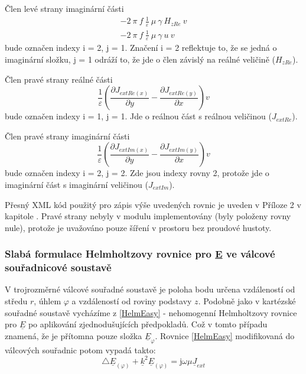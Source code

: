 \documentclass[12pt,a4paper,oneside]{article}
\numberwithin{equation}{section} %
\numberwithin{figure}{section} %
\numberwithin{table}{section} %
\newcommand{\mj}{\mathrm{j}} %
\newcommand{\faz}[1]{{\underline{#1}}} %
\begin{document}
Člen levé strany imaginární části
\begin{subequations}
\begin{gather}
- 2 ~ \pi ~ f ~ \frac{1}{\varepsilon} ~ \mu ~ \gamma ~ H _{zRe} ~ v
\\
- 2 ~ \pi ~ f ~ \frac{1}{\varepsilon} ~ \mu ~ \gamma ~ u ~ v
\end{gather}
\end{subequations}
bude označen indexy i = 2, j = 1. Značení i = 2 reflektuje to, že se jedná o imaginární složku, j = 1 odráží to, že jde o člen závislý na reálné veličině ($H _{zRe}$).

Člen pravé strany reálné části
\begin{equation}
\frac{1}{\varepsilon} \left( \frac{\partial J _{extRe(x)}}{\partial y} - \frac{\partial J _{extRe(y)}}{\partial x} \right) v
\end{equation}
bude označen indexy i = 1, j = 1. Jde o reálnou část s reálnou veličinou ($J _{extRe}$). 

Člen pravé strany imaginární části
\begin{equation}
\frac{1}{\varepsilon} \left(\frac{\partial J _{extIm(x)}}{\partial y} - \frac{\partial J _{extIm(y)}}{\partial x} \right)  v
\end{equation}
bude označen indexy i = 2, j = 2. Zde jsou indexy rovny 2, protože jde o imaginární část s imaginární veličinou ($J _{extIm}$).

Přesný XML kód použitý pro zápis výše uvedených rovnic je uveden v Příloze 2 v kapitole . Pravé strany nebyly v modulu implementovány (byly položeny rovny nule), protože je uvažováno pouze šíření v prostoru bez proudové hustoty.


\subsubsection{Slabá formulace Helmholtzovy rovnice pro \faz{E} ve válcové souřadnicové soustavě}

V trojrozměrné válcové souřadné soustavě je poloha bodu určena vzdáleností od středu $r$, úhlem $\varphi$ a vzdáleností od roviny podstavy $z$. Podobně jako v kartézské souřadné soustavě vycházíme z \ref{HelmEasy} - nehomogenní Helmholtzovy rovnice pro $\faz{E}$ po aplikování zjednodušujících předpokladů. Což v tomto případu znamená, že je přítomna pouze složka $\faz{E} _{\varphi}$. Rovnice \ref{HelmEasy} modifikovaná do válcových souřadnic potom vypadá takto:
\begin{equation}
\triangle \faz{E} _{(\varphi)} + \faz{k} ^2 \faz{E} _{(\varphi)} = \mj \omega \mu \faz{J} _{ext} 
\end{equation}
\end{document}
